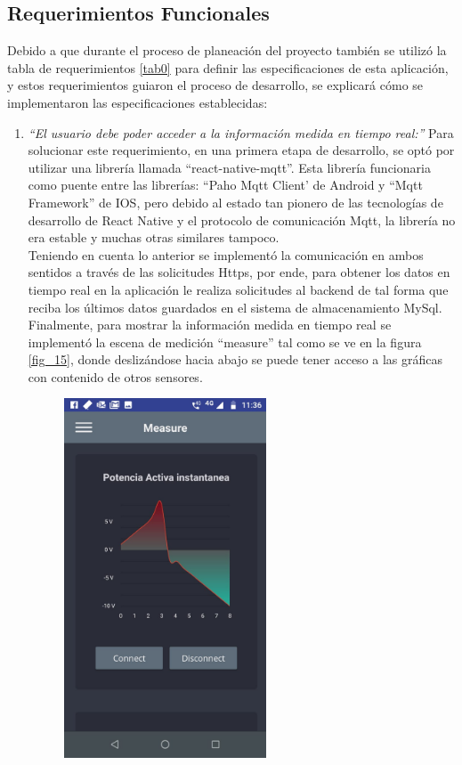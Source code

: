\subsection{Requerimientos Funcionales}

Debido a que durante el proceso de planeación del proyecto también se utilizó la tabla de requerimientos \ref{tab0} para definir las especificaciones de esta aplicación, y estos requerimientos guiaron el proceso de desarrollo, se explicará cómo se implementaron las especificaciones establecidas:

\begin{enumerate}
	\item \textsl{``El usuario debe poder acceder a la información medida en tiempo real:''} Para solucionar este requerimiento, en una primera etapa de desarrollo, se optó por utilizar una librería llamada ``react-native-mqtt''. Esta librería funcionaria como puente entre las librerías: ``Paho Mqtt Client' de Android y ``Mqtt Framework'' de IOS, pero debido al estado tan pionero de las tecnologías de desarrollo de React Native y el protocolo de comunicación Mqtt, la librería no era estable y muchas otras similares tampoco. 
	\vspace{0.5cm}\\
	Teniendo en cuenta lo anterior se implementó la comunicación en ambos sentidos a través de las solicitudes Https, por ende, para obtener los datos en tiempo real en la aplicación le realiza solicitudes al backend de tal forma que reciba los últimos datos guardados en el sistema de almacenamiento MySql.
	\vspace{0.5cm}\\
	Finalmente, para mostrar la información medida en tiempo real se implementó la escena de medición ``measure'' tal como se ve en la figura \ref{fig_15}, donde deslizándose hacia abajo se puede tener acceso a las gráficas con contenido de otros sensores.
	\begin{figure}[htbp]
		\centerline{\includegraphics[width=6cm]{./figuras/mobile_measure.jpeg}}

\end{figure}
\end{enumerate}
